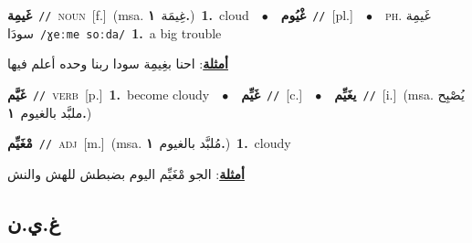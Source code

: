 \documentclass[10pt,a4paper,twoside]{article} %
\begin{document}
\begin{multicols}{2}
{\setlength\topsep{0pt}\textbf{\foreignlanguage{arabic}{غَيمِة}}\ {\color{gray}\texttt{//}\color{black}}\ \textsc{noun}\ [f.]\ \color{gray}(msa. \foreignlanguage{arabic}{غِيمَة}~\foreignlanguage{arabic}{\textbf{١.}})\color{black}\ \textbf{1.}~cloud\ \ $\bullet$\ \ \setlength\topsep{0pt}\textbf{\foreignlanguage{arabic}{غْيُوم}}\ {\color{gray}\texttt{//}\color{black}}\ [pl.]\ \ $\bullet$\ \ \textsc{ph.} \color{gray} \foreignlanguage{arabic}{غَيمِة سودَا}\color{black}\ {\color{gray}\texttt{/{\sffamily ɣeːme soːda}/}\color{black}}\ \textbf{1.}~a big trouble\  \begin{flushright}\color{gray}\foreignlanguage{arabic}{\textbf{\underline{\foreignlanguage{arabic}{أمثلة}}}: احنا بغِيمِة سودا ربنا وحده أعلم فيها}\end{flushright}\color{black}} \vspace{2mm}

{\setlength\topsep{0pt}\textbf{\foreignlanguage{arabic}{غَيَّم}}\ {\color{gray}\texttt{//}\color{black}}\ \textsc{verb}\ [p.]\ \textbf{1.}~become cloudy\ \ $\bullet$\ \ \setlength\topsep{0pt}\textbf{\foreignlanguage{arabic}{غَيِّم}}\ {\color{gray}\texttt{//}\color{black}}\ [c.]\ \ $\bullet$\ \ \setlength\topsep{0pt}\textbf{\foreignlanguage{arabic}{يغَيِّم}}\ {\color{gray}\texttt{//}\color{black}}\ [i.]\ \color{gray}(msa. \foreignlanguage{arabic}{يُصْبِح ملبَّد بالغيوم}~\foreignlanguage{arabic}{\textbf{١.}})\color{black}\ } \vspace{2mm}

{\setlength\topsep{0pt}\textbf{\foreignlanguage{arabic}{مْغَيِّم}}\ {\color{gray}\texttt{//}\color{black}}\ \textsc{adj}\ [m.]\ \color{gray}(msa. \foreignlanguage{arabic}{مُلبَّد بالغيوم}~\foreignlanguage{arabic}{\textbf{١.}})\color{black}\ \textbf{1.}~cloudy\  \begin{flushright}\color{gray}\foreignlanguage{arabic}{\textbf{\underline{\foreignlanguage{arabic}{أمثلة}}}: الجو مْغَيِّم اليوم بضبطش للهش والنش}\end{flushright}\color{black}} \vspace{2mm}

\vspace{-3mm}
\subsection*{\color{blue}\foreignlanguage{arabic}{غ.ي.ن}\color{blue}{}} 


\end{multicols}
\end{document}
